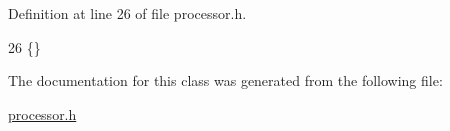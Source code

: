 Definition at line 26 of file processor.\+h.


\begin{DoxyCode}
26 \{\}
\end{DoxyCode}


The documentation for this class was generated from the following file\+:\begin{DoxyCompactItemize}
\item 
\hyperlink{processor_8h}{processor.\+h}\end{DoxyCompactItemize}
